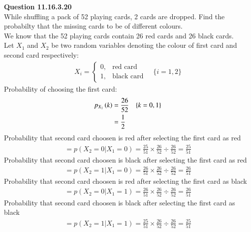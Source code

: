 \documentclass[journal,12pt,onecolumn]{IEEEtran}
\begin{document}
\vspace{3cm}
\title{}
\author{EE22BTECH11029 - Komakula Sreeja}
\maketitle
\textbf{Question 11.16.3.20}\\
While shuffling a pack of 52 playing cards, 2 cards are dropped. Find the probabilty that the missing cards to be of different colours.\\
\solution
\fi
We know that the 52 playing cards contain 26 red cards and 26 black cards.\\
Let $X_1$ and $X_2$ be two random variables denoting the colour of first card and second card respectively:
\begin{align}
         X_i = 
         \begin{cases}
                0, & \text{red card}\\
                1, & \text{black card}
         \end{cases} \quad \{i=1,2\}
\end{align}
Probability of choosing the first card:
\begin{align}
         p_{X_1}\left(k\right) &= \frac{26}{52} \quad \{k=0,1\}\\
                         &= \frac{1}{2}
\end{align} 
Probability that second card choosen is red after selecting the first card as red
\begin{align}
           = p(X_2=0|X_1=0) = \frac{25}{51}\times\frac{26}{52}\div\frac{26}{52}
                        = \frac{25}{51}
\end{align} 
Probability that second card choosen is black after selecting the first card as red
\begin{align} 
          = p(X_2=1|X_1=0) = \frac{26}{51}\times\frac{26}{52}\div\frac{26}{52}
                        = \frac{26}{51}
\end{align}
Probability that second card choosen is red after selecting the first card as black
\begin{align} 
           = p(X_2=0|X_1=1) = \frac{26}{51}\times\frac{26}{52}\div\frac{26}{52}
                        = \frac{26}{51}
\end{align}
Probability that second card choosen is black after selecting the first card as black 
\begin{align} 
           = p(X_2=1|X_1=1) = \frac{25}{51}\times\frac{26}{52}\div\frac{26}{52}
                        = \frac{25}{51} 
\end{align}                   
\end{document}
